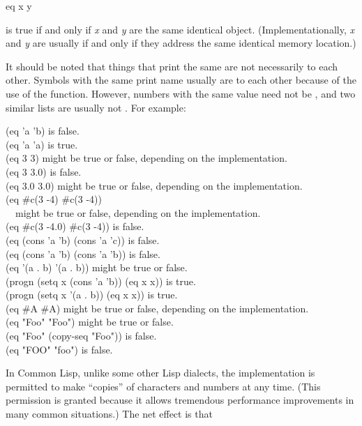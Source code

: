 \begin{defun}[Function]
eq x y

 is true
if and only if {\it x} and {\it y} are the same identical object.
(Implementationally, {\it x} and {\it y} are usually
 if and only if they address the same identical memory location.)

It should be noted that things that print the same are not necessarily 
to each other.  Symbols with the same print name usually are  to
each other because of the use of the  function.
However, numbers with the same value
need not be , and two similar lists are usually not .
For example:
\begin{lisp}
(eq 'a 'b) {\rm is false.} \\
(eq 'a 'a) {\rm is true.} \\
(eq 3 3) {\rm might be true or false, depending on the implementation.} \\
(eq 3 3.0) {\rm is false.} \\
(eq 3.0 3.0) {\rm might be true or false, depending on the implementation.} \\
(eq \#c(3 -4) \#c(3 -4)) \\
~~{\rm might be true or false, depending on the implementation.} \\
(eq \#c(3 -4.0) \#c(3 -4)) {\rm is false.} \\
(eq (cons 'a 'b) (cons 'a 'c)) {\rm is false.} \\
(eq (cons 'a 'b) (cons 'a 'b)) {\rm is false.} \\
(eq '(a . b) '(a . b)) {\rm might be true or false.} \\
(progn (setq x (cons 'a 'b)) (eq x x)) {\rm is true.} \\
(progn (setq x '(a . b)) (eq x x)) {\rm is true.} \\
(eq \#{\Xbackslash}A \#{\Xbackslash}A) {\rm might be true or false, depending on the implementation.} \\
(eq "Foo" "Foo") {\rm might be true or false.} \\
(eq "Foo" (copy-seq "Foo")) {\rm is false.} \\
(eq "FOO" "foo") {\rm is false.}
\end{lisp}
In Common Lisp, unlike some other Lisp dialects, the implementation
is permitted to make ``copies'' of
characters and numbers at any time.  (This permission is granted
because it allows tremendous performance improvements in many
common situations.)  The net effect is that

\end{defun}
